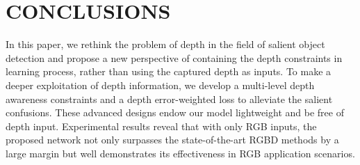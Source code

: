 \documentclass[sigconf]{acmart}
\begin{document}
\section{CONCLUSIONS}
In this paper, we rethink the problem of depth in the field of salient object detection and propose a new perspective of containing the depth constraints in learning process, rather than using the captured depth as inputs. 
To make a deeper exploitation of depth information, we develop a multi-level depth awareness constraints and a depth error-weighted loss to alleviate the salient confusions. These advanced designs endow our model lightweight and be free of depth input.
Experimental results reveal that with only RGB inputs, the proposed network not only surpasses the state-of-the-art RGBD methods by a large margin but well demonstrates its effectiveness in RGB application scenarios.





\appendix
\end{document}
